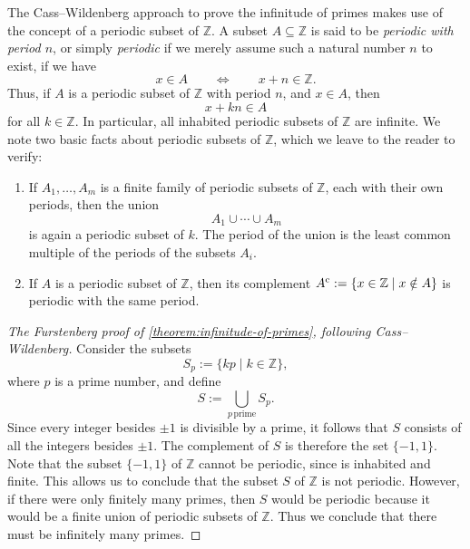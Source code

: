 The Cass--Wildenberg approach to prove the infinitude of primes makes use of the concept of a periodic subset of $\mathbb{Z}$. A subset $A\subseteq\mathbb{Z}$ is said to be \emph{periodic with period $n$}, or simply \emph{periodic} if we merely assume such a natural number $n$ to exist, if we have
\begin{equation*}
  x\in A\qquad\Leftrightarrow\qquad x+n\in\mathbb{Z}.
\end{equation*}
Thus, if $A$ is a periodic subset of $\mathbb{Z}$ with period $n$, and $x\in A$, then
\begin{equation*}
  x+kn\in A
\end{equation*}
for all $k\in\mathbb{Z}$. In particular, all inhabited periodic subsets of $\mathbb{Z}$ are infinite. We note two basic facts about periodic subsets of $\mathbb{Z}$, which we leave to the reader to verify:
\begin{enumerate}
\item If $A_1,\ldots,A_m$ is a finite family of periodic subsets of $\mathbb{Z}$, each with their own periods, then the union
  \begin{equation*}
    A_1\cup\cdots\cup A_m
  \end{equation*}
  is again a periodic subset of $k$. The period of the union is the least common multiple of the periods of the subsets $A_i$.
\item If $A$ is a periodic subset of $\mathbb{Z}$, then its complement $A^{\mathrm{c}} :=\{x\in\mathbb{Z}\mid x\notin A\}$ is periodic with the same period.
\end{enumerate}

\begin{proof}[The Furstenberg proof of \cref{theorem:infinitude-of-primes}, following Cass--Wildenberg]
  Consider the subsets
  \begin{equation*}
    S_p:=\{kp\mid k\in\mathbb{Z}\},
  \end{equation*}
  where $p$ is a prime number, and define
  \begin{equation*}
    S:=\bigcup_{p\,\mathrm{prime}}S_p.
  \end{equation*}
  Since every integer besides $\pm 1$ is divisible by a prime, it follows that $S$ consists of all the integers besides $\pm 1$. The complement of $S$ is therefore the set $\{-1,1\}$. Note that the subset $\{-1,1\}$ of $\mathbb{Z}$ cannot be periodic, since is inhabited and finite. This allows us to conclude that the subset $S$ of $\mathbb{Z}$ is not periodic. However, if there were only finitely many primes, then $S$ would be periodic because it would be a finite union of periodic subsets of $\mathbb{Z}$. Thus we conclude that there must be infinitely many primes.
\end{proof}

